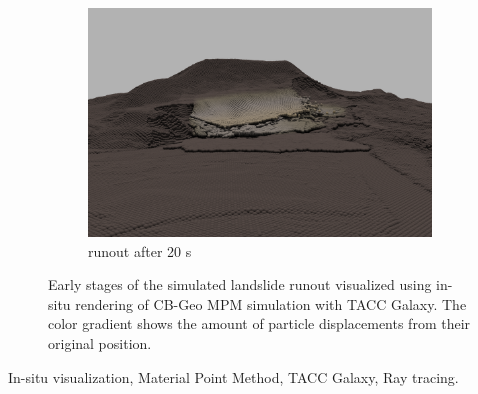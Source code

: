 \documentclass[journal]{IEEEtran}
\begin{document}
\begin{figure}[!tbp]
\begin{subfigure}[b]{0.334\textwidth}
    \end{subfigure}
    \begin{subfigure}[b]{0.333\textwidth}
        \includegraphics[width=\textwidth]{figs/tstep-020000_00000.png}
        \caption{runout after 20 s}
    \end{subfigure}
    \caption{Early stages of the simulated landslide runout visualized using in-situ rendering of CB-Geo MPM simulation with TACC Galaxy. The color gradient shows the amount of particle displacements from their original position.}
    \label{fig:oso3}
\end{figure}

\begin{IEEEkeywords}
In-situ visualization, Material Point Method, TACC Galaxy, Ray tracing.
\end{IEEEkeywords}

\IEEEpeerreviewmaketitle
\end{document}
